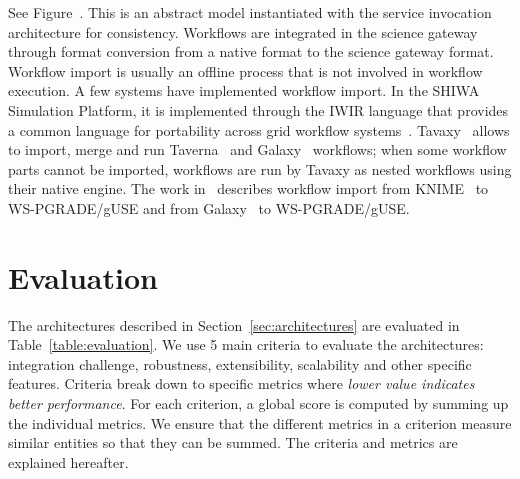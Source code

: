 \documentclass[preprint,3p,twocolumn]{elsarticle}
\newcommand{\note}[2]{\pdfmargincomment[color=yellow,author=#1,open=true]{#2}}
\newcommand{\closednote}[4]{} %
\begin{document}
See Figure~. This is an abstract model
instantiated with the service invocation architecture for
consistency. Workflows are integrated in the science gateway through
format conversion from a native format to the science gateway
format. Workflow import is usually an offline process that is not
involved in workflow execution. A few systems have implemented
workflow import. In the SHIWA Simulation Platform, it is implemented
through the IWIR language that provides a common language for
portability across grid workflow
systems~\cite{plankensteiner-prodan-etal:2013}. Tavaxy~\cite{Abouelhoda2012}
allows to import, merge and run Taverna~\cite{oinn2004taverna} and
Galaxy~\cite{goecks2010galaxy} workflows; when some workflow parts
cannot be imported, workflows are run by Tavaxy as nested workflows
using their native engine. The work in~\cite{delaGarza2016} describes
workflow import from KNIME~\cite{Berthold2008} to WS-PGRADE/gUSE and
from Galaxy~\cite{goecks2010galaxy} to WS-PGRADE/gUSE.
\closednote{Tristan}{Add description of a real system}{Tristan}{Would
  require to reproduce a figure from another paper. The concept seems
  simple enough to not require a figure.}


\section{Evaluation}

\label{sec:evaluation}

The architectures described in Section~\ref{sec:architectures} are
evaluated in Table~\ref{table:evaluation}. We use 5 main criteria to
evaluate the architectures: integration challenge, robustness,
extensibility, scalability and other specific features. Criteria break
down to specific metrics where \emph{lower value indicates better
  performance}. For each criterion, a global score is computed by
summing up the individual metrics. We ensure that the different
metrics in a criterion measure similar entities so that they can be
summed. The criteria and metrics are explained hereafter.
\end{document}
